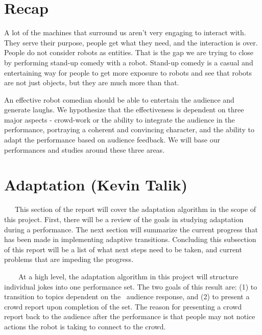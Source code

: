 \documentclass[onecolumn, draftclsnofoot,10pt, compsoc]{IEEEtran}
\begin{document}
\section{Recap}

A lot of the machines that surround us aren't very engaging to interact with. They serve their purpose, people get what they need, and the interaction is over. People do not consider robots as entities. That is the gap we are trying to close by performing stand-up comedy with a robot. Stand-up comedy is a casual and entertaining way for people to get more exposure to robots and see that robots are not just objects, but they are much more than that.

An effective robot comedian should be able to entertain the audience and generate laughs. We hypothesize that the effectiveness is dependent on three major aspects - crowd-work or the ability to integrate the audience in the performance, portraying a coherent and convincing character, and the ability to adapt the performance based on audience feedback. We will base our performances and studies around these three areas.

\section{Adaptation (Kevin Talik)}
   This section of the report will cover the adaptation algorithm in the scope of this project. First, there will be a review of the goals in studying adaptation during a performance. The next section will summarize the current progress that has been made in implementing adaptive transitions. Concluding this subsection of this report will be a list of what next steps need to be taken, and current problems that are impeding the progress.   

    At a high level, the adaptation algorithm in this project will structure individual jokes into one performance set. The two goals of this result are: (1) to transition to topics dependent on the
 audience response, and (2) to present a crowd report upon completion of the set. The reason for presenting a crowd report back to the audience after the performance is that people may not notice actions the robot is taking to connect to the crowd.
\end{document}
